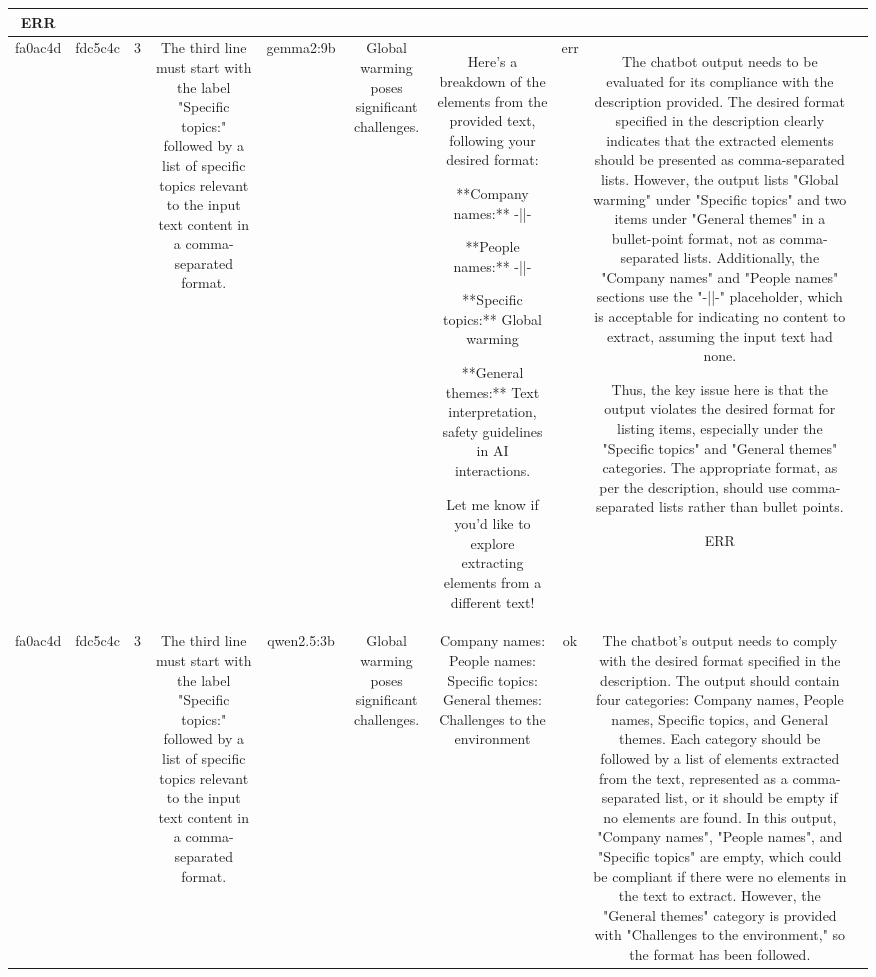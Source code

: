 \begin{table}[h!]
\begin{tabular}{|c|c|c|c|c|c|c|c|c|c|}
ERR & \\
\hline
fa0ac4d & fdc5c4c & 3 & The third line must start with the label "Specific topics:" followed by a list of specific topics relevant to the input text content in a comma-separated format. & gemma2:9b & Global warming poses significant challenges. & Here's a breakdown of the elements from the provided text, following your desired format:

**Company names:** 
-||- 

**People names:** -||-

**Specific topics:** Global warming  

**General themes:** Text interpretation, safety guidelines in AI interactions. 


Let me know if you'd like to explore extracting elements from a different text! 
 & err & The chatbot output needs to be evaluated for its compliance with the description provided. The desired format specified in the description clearly indicates that the extracted elements should be presented as comma-separated lists. However, the output lists "Global warming" under "Specific topics" and two items under "General themes" in a bullet-point format, not as comma-separated lists. Additionally, the "Company names" and "People names" sections use the "-||-" placeholder, which is acceptable for indicating no content to extract, assuming the input text had none. 

Thus, the key issue here is that the output violates the desired format for listing items, especially under the "Specific topics" and "General themes" categories. The appropriate format, as per the description, should use comma-separated lists rather than bullet points.

ERR & \\
\hline
fa0ac4d & fdc5c4c & 3 & The third line must start with the label "Specific topics:" followed by a list of specific topics relevant to the input text content in a comma-separated format. & qwen2.5:3b & Global warming poses significant challenges. & Company names: 
People names: 
Specific topics: 
General themes: Challenges to the environment & ok & The chatbot's output needs to comply with the desired format specified in the description. The output should contain four categories: Company names, People names, Specific topics, and General themes. Each category should be followed by a list of elements extracted from the text, represented as a comma-separated list, or it should be empty if no elements are found. In this output, "Company names", "People names", and "Specific topics" are empty, which could be compliant if there were no elements in the text to extract. However, the "General themes" category is provided with "Challenges to the environment," so the format has been followed.


\end{tabular}
\end{table}
